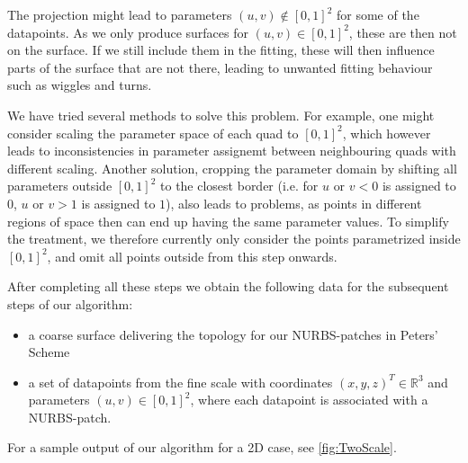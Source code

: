 The projection might lead to parameters $\left(u,v\right)\not\in\left[0,1\right]^2$ for some of the datapoints. As we only produce surfaces for $\left(u,v\right)\in\left[0,1\right]^2$, these are then not on the surface. If we still include them in the fitting, these will then influence parts of the surface that are not there, leading to unwanted fitting behaviour such as wiggles and turns. 

We have tried several methods to solve this problem. For example, one might consider scaling the parameter space of each quad to $\left[0,1\right]^2$, which however leads to inconsistencies in parameter assignemt between neighbouring quads with different scaling. Another solution, cropping the parameter domain by shifting all parameters outside $\left[0,1\right]^2$ to the closest border (i.e. for $u \text{ or } v < 0$ is assigned to $0$, $u \text{ or } v >1$ is assigned to $1$), also leads to problems, as points in different regions of space then can end up having the same parameter values. To simplify the treatment, we therefore currently only consider the points parametrized inside $\left[0,1\right]^2$, and omit all points outside from this step onwards.

After completing all these steps we obtain the following data for the subsequent steps of our algorithm:
\begin{itemize}
\item a coarse surface delivering the topology for our \ac{NURBS}-patches in Peters' Scheme
\item a set of datapoints from the fine scale with coordinates $\left(x,y,z\right)^T\in\mathbb{R}^3$ and parameters $\left(u,v\right)\in\left[0,1\right]^2$, where each datapoint is associated with a \ac{NURBS}-patch. 
\end{itemize}
For a sample output of our algorithm for a 2D case, see \autoref{fig:TwoScale}.

